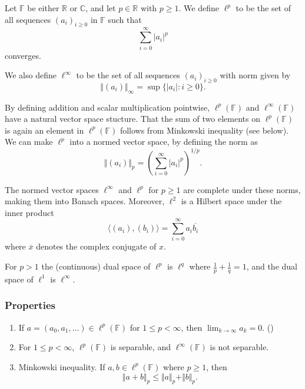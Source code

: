 \documentclass[12pt]{article}
\begin{document}
Let $\mathbb{F}$ be either $\mathbb{R}$ or $\mathbb{C}$, and let $p\in\mathbb{R}$ with $p\geq 1$.  We define $\ell^p$ to be the set of all sequences $(a_i)_{i\geq 0}$ in $\mathbb{F}$ such that $$\sum_{i=0}^{\infty}|a_i|^p$$ converges. 

We also define $\ell^{\infty}$ to be the set of all  sequences $(a_i)_{i\geq 0}$ with norm given by $$\Vert (a_i)\Vert_{\infty} = \operatorname{sup}\{ |a_i|:i\geq 0\}.$$

By defining addition and scalar multiplication pointwise, $\ell^p(\mathbb{F})$ and
$\ell^\infty(\mathbb{F})$ have a natural vector space stucture.
That the sum of two elements on $\ell^p(\mathbb{F})$ is again an element
in $\ell^p(\mathbb{F})$ follows from Minkowski inequality
(see below).
We can make $\ell^p$ into a normed vector space, by defining the norm as $$\Vert (a_i)\Vert_p = (\sum_{i=0}^{\infty}|a_i|^p)^{1/p}.$$

The normed vector spaces $\ell^{\infty}$ and $\ell^p$ for $p\geq 1$ are complete under these norms, making them into Banach spaces.  Moreover, $\ell^2$ is a Hilbert space under the inner product $$\langle (a_i),(b_i)\rangle = \sum_{i=0}^{\infty}a_i \overline{b_i}$$ where $\overline{x}$ denotes the complex conjugate of $x$.

For $p>1$ the (continuous) dual space of $\ell^p$ is $\ell^q$ where $\frac{1}{p} + \frac{1}{q}=1$, and the dual space of $\ell^1$ is $\ell^{\infty}$.

\subsubsection*{Properties}
\begin{enumerate}
\item If $a=(a_0,a_1, \ldots ) \in \ell^p(\mathbb{F})$ for $1\le p< \infty$, then
$\lim_{k\to \infty} a_k =0$.
()
\item For $1\le p<\infty$, $\ell^p(\mathbb{F})$ is separable, and $\ell^\infty(\mathbb{F})$
is not separable.
\item Minkowski inequality. If $a,b\in \ell^p(\mathbb{F})$ where $p\ge 1$, then
$$
\Vert a+b \Vert_p \le \Vert a\Vert_p + \Vert b \Vert_p.
$$
\end{enumerate}

\end{document}
